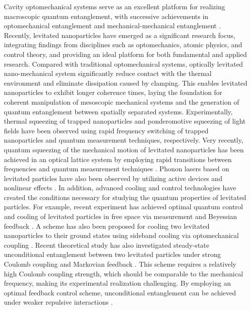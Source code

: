 \documentclass[
aps,
reprint,
superscriptaddress,
amsmath,amssymb,
pra
]{revtex4-2}
\begin{document}
Cavity optomechanical \cite{RevModPhys.86.1391} systems serve as an excellent platform for realizing macroscopic quantum entanglement, with successive achievements in optomechanical entanglement \cite{PhysRevLett.98.030405, PhysRevA.78.032316, PhysRevA.84.052327} and mechanical-mechanical entanglement \cite{PhysRevA.87.022318, PhysRevA.89.063805, ockeloen2018stabilized, Li_2015}. Recently, levitated nanoparticles \cite{millen2020optomechanics, chang2010cavity, PhysRevA.83.013803, gonzalez2021levitodynamics} have emerged as a significant research focus, integrating findings from disciplines such as optomechanics, atomic physics, and control theory, and providing an ideal platform for both fundamental and applied research. Compared with traditional optomechanical systems, optically levitated nano-mechanical system significantly reduce contact with the thermal environment and eliminate dissipation caused by clamping. This enables levitated nanoparticles to exhibit longer coherence times, laying the foundation for coherent manipulation of mesoscopic mechanical systems and the generation of quantum entanglement between spatially separated systems. Experimentally, thermal squeezing \cite{PhysRevLett.117.273601} of trapped nanoparticles and ponderomotive squeezing \cite{PhysRevLett.129.053602} of light fields have been observed using rapid frequency switching of trapped nanoparticles and quantum measurement techniques, respectively. Very recently, quantum squeezing of the mechanical motion of levitated nanoparticles has been achieved in an optical lattice system by employing rapid transitions between frequencies and quantum measurement techniques \cite{2504.17944}. Phonon lasers based on levitated particles have also been observed by utilizing active devices and nonlinear effects \cite{kuang2023nonlinear}. In addition, advanced cooling \cite{PhysRevLett.109.103603, doi:10.1073/pnas.1309167110, asenbaum2013cavity, PhysRevLett.122.223601} and control \cite{PhysRevLett.121.033603, PhysRevLett.121.033602, PhysRevLett.117.123604, Kuhn:17, magrini2021real} technologies have created the conditions necessary for studying the quantum properties of levitated particles. For example, recent experiment has achieved optimal quantum control and cooling of levitated particles in free space via measurement and Beyessian  feedback \cite{tebbenjohanns2021quantum}. A scheme has also been proposed for cooling two levitated nanoparticles to their ground states using sideband cooling via optomechanical coupling \cite{PhysRevA.109.053521}. Recent theoretical study has also investigated steady-state unconditional entanglement between two levitated particles under strong Coulomb coupling and Markovian feedback \cite{PhysRevLett.129.193602}. This scheme requires a relatively high Coulomb coupling strength, which should be comparable to the mechanical frequency, making its experimental realization challenging. By employing an optimal feedback control scheme, unconditional entanglement can be achieved under weaker repulsive interactions \cite{2408.07492}. 
\end{document}
